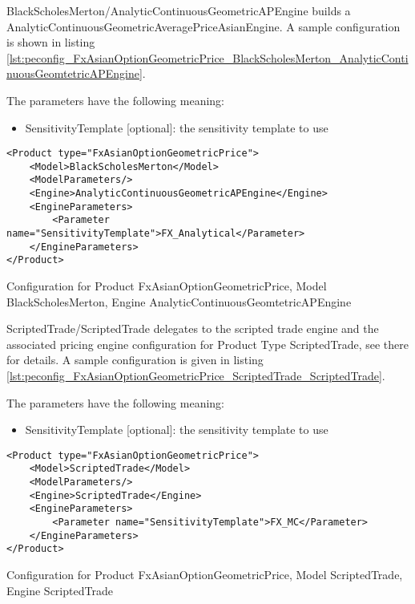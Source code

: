 BlackScholesMerton/AnalyticContinuousGeometricAPEngine builds a AnalyticContinuousGeometricAveragePriceAsianEngine. A sample
configuration is shown in listing
\ref{lst:peconfig_FxAsianOptionGeometricPrice_BlackScholesMerton_AnalyticContinuousGeomtetricAPEngine}.

The parameters have the following meaning:

\begin{itemize}
\item SensitivityTemplate [optional]: the sensitivity template to use 
\end{itemize}

\begin{longlisting}
\begin{verbatim}
<Product type="FxAsianOptionGeometricPrice">
    <Model>BlackScholesMerton</Model>
    <ModelParameters/>
    <Engine>AnalyticContinuousGeometricAPEngine</Engine>
    <EngineParameters>
        <Parameter name="SensitivityTemplate">FX_Analytical</Parameter>
    </EngineParameters>
</Product>
\end{verbatim}
\caption{Configuration for Product FxAsianOptionGeometricPrice, Model BlackScholesMerton, Engine AnalyticContinuousGeomtetricAPEngine}
\label{lst:peconfig_FxAsianOptionGeometricPrice_BlackScholesMerton_AnalyticContinuousGeomtetricAPEngine}
\end{longlisting}

ScriptedTrade/ScriptedTrade delegates to the scripted trade engine and the associated pricing engine configuration for
Product Type ScriptedTrade, see there for details. A sample configuration is given in listing
\ref{lst:peconfig_FxAsianOptionGeometricPrice_ScriptedTrade_ScriptedTrade}.

The parameters have the following meaning:

\begin{itemize}
\item SensitivityTemplate [optional]: the sensitivity template to use 
\end{itemize}

\begin{longlisting}
\begin{verbatim}
<Product type="FxAsianOptionGeometricPrice">
    <Model>ScriptedTrade</Model>
    <ModelParameters/>
    <Engine>ScriptedTrade</Engine>
    <EngineParameters>
        <Parameter name="SensitivityTemplate">FX_MC</Parameter>
    </EngineParameters>
</Product>
\end{verbatim}
\caption{Configuration for Product FxAsianOptionGeometricPrice, Model ScriptedTrade, Engine ScriptedTrade}
\label{lst:peconfig_FxAsianOptionGeometricPrice_ScriptedTrade_ScriptedTrade}
\end{longlisting}


